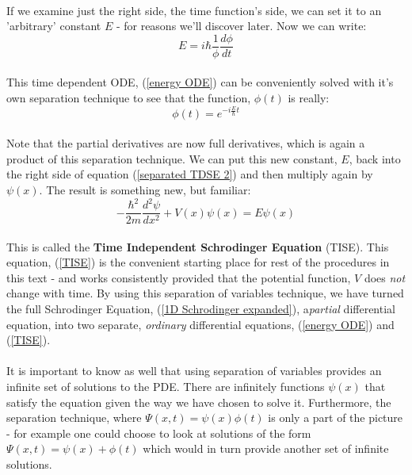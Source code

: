 \documentclass[12pt,letterpaper]{book}
\begin{document}
\paragraph*{}If we examine just the right side, the time function's side, we can set it to an 'arbitrary' constant $E$ - for reasons we'll discover later. Now we can write:
\begin{equation}
\label{energy ODE}
E = i\hbar \frac{1}{\phi}\frac{d\phi}{dt}
\end{equation}
\paragraph*{}This time dependent ODE, (\ref{energy ODE}) can be conveniently solved with it's own separation technique to see that the function, $\phi(t)$ is really:
\begin{equation}
\label{phi}
\phi(t) =  e^{-i\frac{E}{\hbar}t}
\end{equation}
\paragraph*{}Note that the partial derivatives are now full derivatives, which is again a product of this separation technique. We can put this new constant, $E$, back into the right side of equation (\ref{separated TDSE 2}) and then multiply again by $\psi(x)$. The result is something new, but familiar:
\begin{equation}
\label{TISE}
-\frac{\hbar^2}{2m}\frac{d^2\psi}{dx^2} + V(x)\psi(x) = E\psi(x)
\end{equation}
\paragraph*{}This is called the \textbf{Time Independent Schrodinger Equation} (TISE). This equation, (\ref{TISE}) is the convenient starting place for rest of the procedures in this text - and works consistently provided that the potential function, $V$ does \textit{not} change with time. By using this separation of variables technique, we have turned the full Schrodinger Equation, (\ref{1D Schrodinger expanded}), a\textit{partial} differential equation, into two separate, \textit{ordinary} differential equations, 
(\ref{energy ODE}) and  (\ref{TISE}). 
\paragraph*{}It is important to know as well that using separation of variables provides an infinite set of solutions to the PDE. There are infinitely functions $\psi(x)$ that satisfy the equation given the way we have chosen to solve it. Furthermore, the separation technique, where $\Psi(x,t) = \psi(x)\phi(t)$ is only a part of the picture - for example one could choose to look at solutions of the form $\Psi(x,t) = \psi(x) + \phi(t)$ which would in turn provide another set of infinite solutions. 
\end{document}
